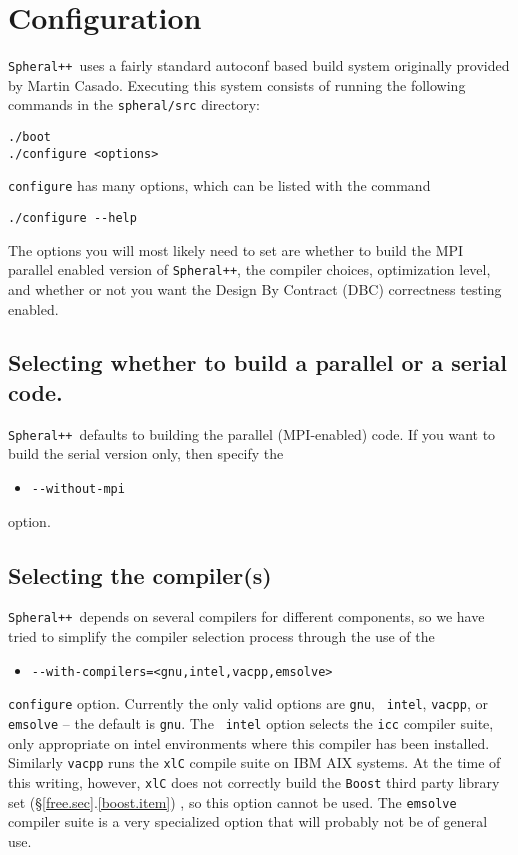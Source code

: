 \documentclass{article}
\newcommand{\Spheral}{{\tt Spheral++}}
\begin{document}
\section{Configuration}
\Spheral\ uses a fairly standard autoconf based build system originally
provided by Martin Casado.  Executing this system consists of running the
following commands in the {\tt spheral/src} directory:
\begin{verbatim}
./boot
./configure <options>
\end{verbatim}
{\tt configure} has many options, which can be listed with the command
\begin{verbatim}
./configure --help
\end{verbatim}
The options you will most likely need to set are whether to build the MPI
parallel enabled version of \Spheral, the compiler choices, optimization level,
and whether or not you want the Design By Contract (DBC) correctness testing
enabled.

\subsection{Selecting whether to build a parallel or a serial code.}
\Spheral\ defaults to building the parallel (MPI-enabled) code.  If you want to
build the serial version only, then specify the
\begin{itemize}
\item\verb+--without-mpi+
\end{itemize}
option.

\subsection{Selecting the compiler(s)}
\Spheral\ depends on several compilers for different components, so we have
tried to simplify the compiler selection process through the use of the
\begin{itemize}
\item \verb+--with-compilers=<gnu,intel,vacpp,emsolve>+
\end{itemize}
{\tt configure} option.  Currently the only valid options are {\tt gnu}, {\tt
  intel}, {\tt vacpp}, or {\tt emsolve} -- the default is {\tt gnu}.  The {\tt
  intel} option selects the {\tt icc} compiler suite, only appropriate on intel
environments where this compiler has been installed.  Similarly {\tt vacpp} runs
the {\tt xlC} compile suite on IBM AIX systems.  At the time of this writing,
however, {\tt xlC} does not correctly build the {\tt Boost} third party library
set (\S \ref{free.sec}.\ref{boost.item}) , so this option cannot be used.  The
{\tt emsolve} compiler suite is a very specialized option that will probably not
be of general use.
\end{document}
